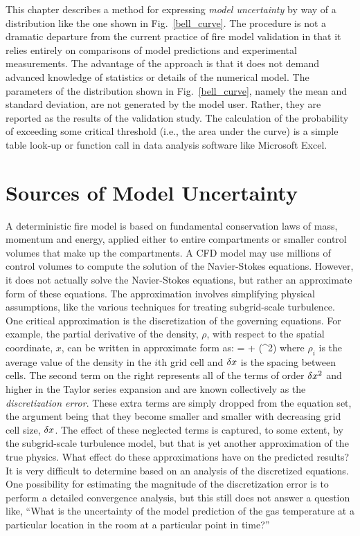 This chapter describes a method for expressing {\em model uncertainty} by way of a distribution like the one shown in Fig.~\ref{bell_curve}. The procedure is not a dramatic departure from the current practice of fire model validation in that it relies entirely on comparisons of model predictions and experimental measurements. The advantage of the approach is that it does not demand advanced knowledge of statistics or details of the numerical model. The parameters of the distribution shown in Fig.~\ref{bell_curve}, namely the mean and standard deviation, are not generated by the model user. Rather, they are reported as the results of the validation study. The calculation of the probability of exceeding some critical threshold (i.e., the area under the curve) is a simple table look-up or function call in data analysis software like Microsoft Excel\textregistered.



\section{Sources of Model Uncertainty}

A deterministic fire model is based on fundamental conservation laws of mass, momentum and energy, applied either to entire compartments or smaller control volumes that make up the compartments. A CFD model may use millions of control volumes to compute the solution of the Navier-Stokes equations.  However, it does not actually solve the Navier-Stokes equations, but rather an approximate form of these equations.  The approximation involves simplifying physical assumptions, like the various techniques for treating subgrid-scale turbulence.  One critical approximation is the discretization of the governing equations. For example, the partial derivative of the density, $\rho$, with respect to the spatial coordinate, $x$, can be written in approximate form as:
\be {} =  + (\dx^2) \ee
where $\rho_i$ is the average value of the density in the $i$th grid cell and $\delta x$ is the spacing between cells.  The second term on the right represents all of the terms of order $\delta x^2$ and higher in the Taylor series expansion and are known collectively as the {\em discretization error}. These extra terms are simply dropped from the equation set, the argument being that they become smaller and smaller with decreasing grid cell size, $\delta x$.  The effect of these neglected terms is captured, to some extent, by the subgrid-scale turbulence model, but that is yet another approximation of the true physics.  What effect do these approximations have on the predicted results? It is very difficult to determine based on an analysis of the discretized equations.  One possibility for estimating the magnitude of the discretization error is to perform a detailed convergence analysis, but this still does not answer a question like, ``What is the uncertainty of the model prediction of the gas temperature at a particular location in the room at a particular point in time?''

